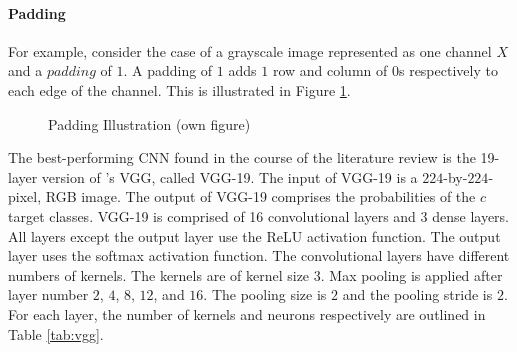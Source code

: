\paragraph{Padding} For example, consider the case of a grayscale image represented as one channel $X$ and a $padding$ of $1$. A padding of $1$ adds $1$ row and column of $0$s respectively to each edge of the channel. This is illustrated in Figure \ref{fig:padding}.\autocite{Goodfellow.2016}
\begin{figure}[H]
	\centering
	
	\caption{Padding Illustration (own figure)} \label{fig:padding}
\end{figure}
\par
The best-performing \ac{CNN} found in the course of the literature review is the 19-layer version of \cite{Simonyan.2014}'s VGG, called VGG-19.
The input of VGG-19 is a $224$-by-$224$-pixel, \ac{RGB} image. The output of VGG-19 comprises the probabilities of the $c$ target classes. 
VGG-19 is comprised of 16 convolutional layers and 3 dense layers.
All layers except the output layer use the \ac{ReLU} activation function. The output layer uses the softmax activation function.
The convolutional layers have different numbers of kernels. The kernels are of kernel size $3$.
Max pooling is applied after layer number $2$, $4$, $8$, $12$, and $16$. The pooling size is $2$ and the pooling stride is $2$.
For each layer, the number of kernels and neurons respectively are outlined in Table \ref{tab:vgg}. \autocite{Simonyan.2014}
